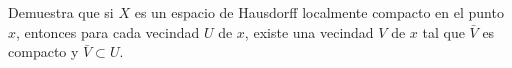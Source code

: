  \item Demuestra que si $X$ es un espacio de Hausdorff localmente compacto en el punto $x$, entonces para cada vecindad $U$ de $x$, existe una vecindad $V$ de $x$ tal que $\bar{V}$ es compacto y $\bar{V} \subset U$.